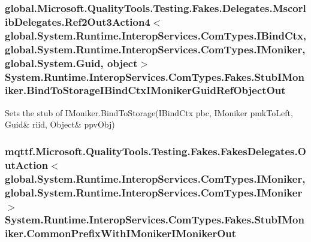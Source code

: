 \hypertarget{class_system_1_1_runtime_1_1_interop_services_1_1_com_types_1_1_fakes_1_1_stub_i_moniker_aeaa61bf9e71173825047fde09c692560}{
\subsubsection[{Bind\-To\-Storage\-I\-Bind\-Ctx\-I\-Moniker\-Guid\-Ref\-Object\-Out}]{\setlength{\rightskip}{0pt plus 5cm}global.\-Microsoft.\-Quality\-Tools.\-Testing.\-Fakes.\-Delegates.\-Mscorlib\-Delegates.\-Ref2\-Out3\-Action4$<$global.\-System.\-Runtime.\-Interop\-Services.\-Com\-Types.\-I\-Bind\-Ctx, global.\-System.\-Runtime.\-Interop\-Services.\-Com\-Types.\-I\-Moniker, global.\-System.\-Guid, object$>$ System.\-Runtime.\-Interop\-Services.\-Com\-Types.\-Fakes.\-Stub\-I\-Moniker.\-Bind\-To\-Storage\-I\-Bind\-Ctx\-I\-Moniker\-Guid\-Ref\-Object\-Out}}\label{class_system_1_1_runtime_1_1_interop_services_1_1_com_types_1_1_fakes_1_1_stub_i_moniker_aeaa61bf9e71173825047fde09c692560}


Sets the stub of I\-Moniker.\-Bind\-To\-Storage(I\-Bind\-Ctx pbc, I\-Moniker pmk\-To\-Left, Guid\& riid, Object\& ppv\-Obj)

\hypertarget{class_system_1_1_runtime_1_1_interop_services_1_1_com_types_1_1_fakes_1_1_stub_i_moniker_a6768e59f466d1991ca7f9c2971be80c1}{
\subsubsection[{Common\-Prefix\-With\-I\-Moniker\-I\-Moniker\-Out}]{\setlength{\rightskip}{0pt plus 5cm}mqttf.\-Microsoft.\-Quality\-Tools.\-Testing.\-Fakes.\-Fakes\-Delegates.\-Out\-Action$<$global.\-System.\-Runtime.\-Interop\-Services.\-Com\-Types.\-I\-Moniker, global.\-System.\-Runtime.\-Interop\-Services.\-Com\-Types.\-I\-Moniker$>$ System.\-Runtime.\-Interop\-Services.\-Com\-Types.\-Fakes.\-Stub\-I\-Moniker.\-Common\-Prefix\-With\-I\-Moniker\-I\-Moniker\-Out}}\label{class_system_1_1_runtime_1_1_interop_services_1_1_com_types_1_1_fakes_1_1_stub_i_moniker_a6768e59f466d1991ca7f9c2971be80c1}


